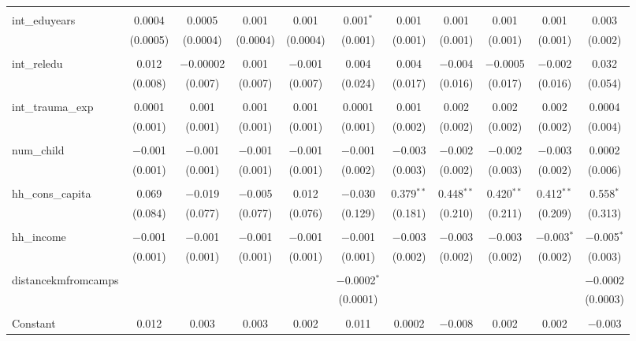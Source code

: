 \begin{table}[H]
\begin{tabular}{@{\extracolsep{4pt}}lcccccccccc}
  & & & & & & & & & & \\ 
 int\_eduyears & 0.0004 & 0.0005 & 0.001 & 0.001 & 0.001$^{*}$ & 0.001 & 0.001 & 0.001 & 0.001 & 0.003 \\ 
  & (0.0005) & (0.0004) & (0.0004) & (0.0004) & (0.001) & (0.001) & (0.001) & (0.001) & (0.001) & (0.002) \\ 
  & & & & & & & & & & \\ 
 int\_reledu & 0.012 & $-$0.00002 & 0.001 & $-$0.001 & 0.004 & 0.004 & $-$0.004 & $-$0.0005 & $-$0.002 & 0.032 \\ 
  & (0.008) & (0.007) & (0.007) & (0.007) & (0.024) & (0.017) & (0.016) & (0.017) & (0.016) & (0.054) \\ 
  & & & & & & & & & & \\ 
 int\_trauma\_exp & 0.0001 & 0.001 & 0.001 & 0.001 & 0.0001 & 0.001 & 0.002 & 0.002 & 0.002 & 0.0004 \\ 
  & (0.001) & (0.001) & (0.001) & (0.001) & (0.001) & (0.002) & (0.002) & (0.002) & (0.002) & (0.004) \\ 
  & & & & & & & & & & \\ 
 num\_child & $-$0.001 & $-$0.001 & $-$0.001 & $-$0.001 & $-$0.001 & $-$0.003 & $-$0.002 & $-$0.002 & $-$0.003 & 0.0002 \\ 
  & (0.001) & (0.001) & (0.001) & (0.001) & (0.002) & (0.003) & (0.002) & (0.003) & (0.002) & (0.006) \\ 
  & & & & & & & & & & \\ 
 hh\_cons\_capita & 0.069 & $-$0.019 & $-$0.005 & 0.012 & $-$0.030 & 0.379$^{**}$ & 0.448$^{**}$ & 0.420$^{**}$ & 0.412$^{**}$ & 0.558$^{*}$ \\ 
  & (0.084) & (0.077) & (0.077) & (0.076) & (0.129) & (0.181) & (0.210) & (0.211) & (0.209) & (0.313) \\ 
  & & & & & & & & & & \\ 
 hh\_income & $-$0.001 & $-$0.001 & $-$0.001 & $-$0.001 & $-$0.001 & $-$0.003 & $-$0.003 & $-$0.003 & $-$0.003$^{*}$ & $-$0.005$^{*}$ \\ 
  & (0.001) & (0.001) & (0.001) & (0.001) & (0.001) & (0.002) & (0.002) & (0.002) & (0.002) & (0.003) \\ 
  & & & & & & & & & & \\ 
 distancekmfromcamps &  &  &  &  & $-$0.0002$^{*}$ &  &  &  &  & $-$0.0002 \\ 
  &  &  &  &  & (0.0001) &  &  &  &  & (0.0003) \\ 
  & & & & & & & & & & \\ 
 Constant & 0.012 & 0.003 & 0.003 & 0.002 & 0.011 & 0.0002 & $-$0.008 & 0.002 & 0.002 & $-$0.003 \\ 

\end{tabular}
\end{table}
